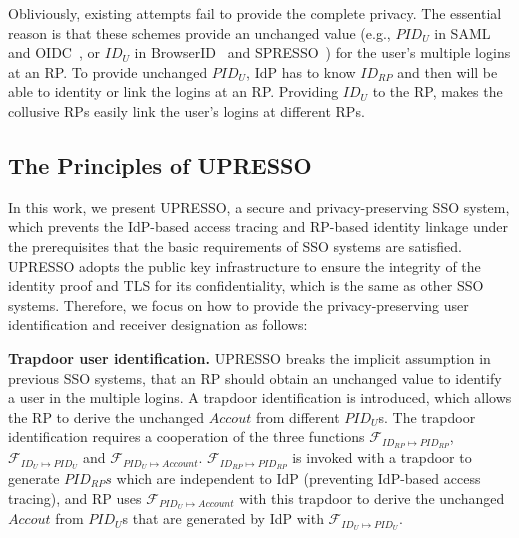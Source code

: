 Obliviously, existing attempts fail to provide the complete  privacy.
The essential reason is that these schemes provide an unchanged value (e.g., $PID_{U}$ in SAML~\cite{SAMLIdentifier} and OIDC~\cite{OpenIDConnect}, or $ID_U$ in BrowserID~\cite{BrowserID} and SPRESSO~\cite{SPRESSO}) for the user's multiple logins at an RP.
To provide unchanged $PID_{U}$, IdP has to know $ID_{RP}$ and then will be able to identity or link the logins at an RP.
Providing $ID_U$ to the RP, makes  the collusive RPs easily link the user's logins at different RPs.


\subsection{The Principles of UPRESSO}
\label{subsec:solutions}
In this work, we present UPRESSO, a secure and privacy-preserving SSO system,
which prevents the IdP-based access tracing and RP-based identity linkage under the prerequisites that  the basic requirements of SSO systems are satisfied.
UPRESSO adopts the public key infrastructure to ensure the integrity of the identity proof and TLS for its confidentiality, which is the same as other SSO systems.
Therefore, we focus on how to provide the privacy-preserving user identification and receiver designation as follows:

\vspace{1mm}\noindent \textbf{Trapdoor user identification.} UPRESSO breaks the implicit assumption in previous SSO systems, that an RP should obtain an unchanged value to identify a user in the multiple logins.
A trapdoor identification is introduced, which allows the RP  to derive the unchanged $Accout$ from different $PID_{U}$s.
The trapdoor identification requires a cooperation of the three functions $\mathcal{F}_{ID_{RP} \mapsto PID_{RP}}$, $\mathcal{F}_{ID_{U} \mapsto PID_{U}}$ and $\mathcal{F}_{PID_{U} \mapsto Account}$.
$\mathcal{F}_{ID_{RP} \mapsto PID_{RP}}$  is invoked with a trapdoor to generate $PID_{RP}s$ which are independent to IdP (preventing IdP-based access tracing),
 and RP uses $\mathcal{F}_{PID_{U} \mapsto Account}$ with this trapdoor to derive the unchanged $Accout$  from $PID_{U}$s that are generated by IdP with $\mathcal{F}_{ID_{U} \mapsto PID_{U}}$.

